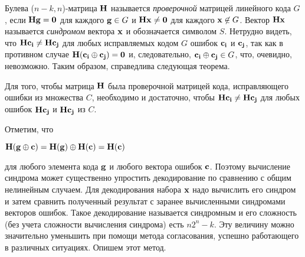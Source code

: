 \documentclass[12pt]{article}
\numberwithin{equation}{section}
\begin{document}
	Булева ($n-k,n$)-матрица ${\bf H}$ называется \textit{проверочной} матрицей линейного кода $G$, если 
	${\bf Hg = 0}$ для каждого ${\bf g} \in G$ и ${\bf Hx \not=0}$ для каждого ${\bf x} \not\in G$. Вектор
	${\bf Hx}$ называется \textit{синдромом} вектора ${\bf x}$ и обозначается символом $S$. Нетрудно 
	видеть, что ${\bf Hc_i} \not= {\bf Hc_j}$ для любых исправляемых кодом $G$ ошибок ${\bf c_i}$ и ${\bf 
	c_j}$, так как в противном случае ${\bf H(c_i \oplus c_j)=0}$ и, следовательно, ${\bf c_i} \oplus {\bf 
	c_j} \in G$, что, очевидно, невозможно. Таким образом, справедлива следующая теорема. 
	
	\begin{Def}\label{onethree}
		Для того, чтобы матрица  ${\bf H}$ была проверочной матрицей кода, исправляющего ошибки из
		множества $C$, необходимо и достаточно, чтобы ${\bf Hc_i} \not= {\bf Hc_j}$ для любых ошибок 
		${\bf Hc_j}$ и ${\bf Hc_j}$ из $C$.
	\end{Def}
	Отметим, что 
	\begin{center}
		${\bf H(g \oplus c) = H(g) \oplus H(c) = H(c)}$
	\end{center}
	для любого элемента кода ${\bf g}$ и любого вектора ошибок ${\bf c}$. Поэтому вычисление 
	синдрома может существенно упростить декодирование по сравнению с общим нелинейным случаем. Для
	декодирования набора ${\bf x}$ надо вычислить его синдром и затем сравнить полученный результат с 
	заранее вычисленными синдромами векторов ошибок. Такое декодирование называется синдромным и его 
	сложность (без учета сложности вычисления синдрома) есть \textit{$n2^n-k$}. Эту величину можно 
	значительно уменьшить при помощи метода согласования, успешно работающего в различных ситуациях.
	Опишем этот метод. \newpage
	
\end{document}
